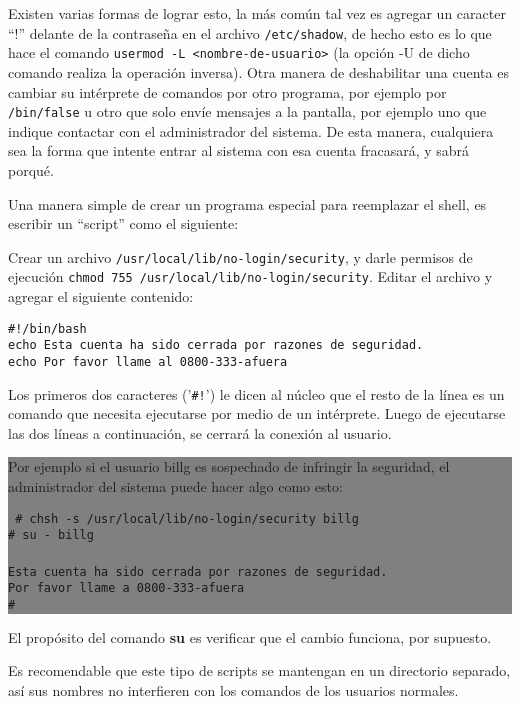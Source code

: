 \documentclass[12pt]{article}
\begin{document}
Existen varias formas de lograr esto, la más común tal vez es agregar un caracter 
``!'' delante de la contraseña en el archivo \texttt{/etc/shadow}, de hecho esto 
es lo que hace el comando \texttt{usermod -L <nombre-de-usuario>} (la opción -U
de dicho comando realiza la operación inversa). Otra manera de deshabilitar una 
cuenta es cambiar su intérprete de comandos por otro programa, por ejemplo por 
\texttt{/bin/false} u otro  que solo envíe mensajes a la pantalla, por 
ejemplo uno que indique contactar con el administrador del sistema. De esta manera, 
cualquiera sea la forma que intente entrar al sistema con esa cuenta fracasará, 
y sabrá porqué. 

Una manera simple de crear un programa especial para reemplazar el shell, 
es escribir un ``script'' como el siguiente: 

Crear un archivo \texttt{/usr/local/lib/no-login/security}, y darle permisos de 
ejecución \texttt{chmod 755 /usr/local/lib/no-login/security}. Editar
el archivo y agregar el siguiente contenido: 

\begin{verbatim} 
#!/bin/bash 
echo Esta cuenta ha sido cerrada por razones de seguridad.
echo Por favor llame al 0800-333-afuera
\end{verbatim}

Los primeros dos caracteres ('\texttt{\#!}') le dicen al núcleo que el
resto de la línea es un comando que necesita ejecutarse por medio de un
intérprete. Luego de ejecutarse las dos líneas a continuación, 
se cerrará la conexión al usuario. 

\colorbox{grey}{\parbox[t]{0.95\linewidth}{ \vspace*{0.5cm} 
{
Por ejemplo si el usuario billg es sospechado
de infringir la seguridad, el administrador del sistema 
puede hacer algo como esto: 

\tt  
\# chsh -s /usr/local/lib/no-login/security billg \\
\# su - billg \\
 \\
    Esta cuenta ha sido cerrada por razones de seguridad. \\
    Por favor llame a 0800-333-afuera \\
\#  
} \vspace*{0.5cm} } } 

El propósito del comando \textbf{su} es verificar que el cambio
funciona, por supuesto.  

Es recomendable que este tipo de scripts se mantengan en un directorio
separado, así sus nombres
no interfieren con los comandos de los usuarios normales.



\end{document}
